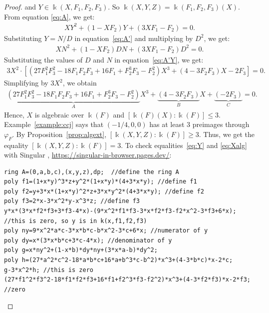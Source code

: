 \documentclass[11pt,reqno]{amsart}
\theoremstyle{definition}
\newcommand{\mbk}{\mbox{$\Bbbk$}}
\begin{document}
\begin{proof}
and $Y\in \mbk(X,F_1,F_2,F_3)$. So $\mbk(X,Y,Z)=\mbk(F_1,F_2,F_3)(X)$. From equation \eqref{eq:A}, we get:
\begin{eqnarray}\label{eq:A'}
XY^2+(1-XF_2)Y+(3XF_1-F_2)=0.
\end{eqnarray}
Substituting $Y=N/D$ in equation~\eqref{eq:A'} and multiplying by $D^2$, we get:
\begin{eqnarray}\label{eq:A'Y}
XN^2+(1-XF_2)DN+(3XF_1-F_2)D^2=0. 
\end{eqnarray}
Substituting the values of $D$ and $N$ in equation~\ref{eq:A'Y}, we get: 
\begin{eqnarray*}
3X^2\cdot\left[(27F_1^2F_3^2-18F_1F_2F_3+16F_1+F_2^3F_3-F_2^2)X^3+(4-3F_2F_3)X-2F_3\right]=0.
\end{eqnarray*}
Simplifying by $3X^2$, we obtain
\begin{eqnarray}\label{eq:Xalg}
\underbrace{(27F_1^2F_3^2-18F_1F_2F_3+16F_1+F_2^3F_3-F_2^2)}_AX^3+
\underbrace{(4-3F_2F_3)}_BX+\underbrace{(-2F_3)}_{C}=0.
\end{eqnarray}
Hence, $X$ is algebraic over $\mbk(F)$ and  
$[\mbk(F)(X):\mbk(F)]\leq 3$.
Example~\ref{example:ccj} says that $(-1/4,0,0)$ has at least
3 preimages through $\varphi_F$. 
By Proposition~\ref{prop:algext}, $[\mbk(X,Y,Z):\mbk(F)]\geq 3$.
Thus, we get the equality $[\mbk(X,Y,Z):\mbk(F)]=3$.
To check equalities~\eqref{eq:Y} and \eqref{eq:Xalg} with {\sc Singular} \cite{dgps},
\url{https://singular-in-browser.pages.dev/}:

\begin{verbatim}
ring A=(0,a,b,c),(x,y,z),dp;  //define the ring A
poly f1=(1+x*y)^3*z+y^2*(1+x*y)*(4+3*x*y); //define f1 
poly f2=y+3*x*(1+x*y)^2*z+3*x*y^2*(4+3*x*y); //define f2
poly f3=2*x-3*x^2*y-x^3*z; //define f3
y*x*(3*x*f2*f3+3*f3-4*x)-(9*x^2*f1*f3-3*x*f2*f3-f2*x^2-3*f3+6*x); 
//this is zero, so y is in k(x,f1,f2,f3)
poly ny=9*x^2*a*c-3*x*b*c-b*x^2-3*c+6*x; //numerator of y
poly dy=x*(3*x*b*c+3*c-4*x); //denominator of y
poly g=x*ny^2+(1-x*b)*dy*ny+(3*x*a-b)*dy^2; 
poly h=(27*a^2*c^2-18*a*b*c+16*a+b^3*c-b^2)*x^3+(4-3*b*c)*x-2*c; 
g-3*x^2*h; //this is zero
(27*f1^2*f3^2-18*f1*f2*f3+16*f1+f2^3*f3-f2^2)*x^3+(4-3*f2*f3)*x-2*f3; //zero
\end{verbatim}
\end{proof}
\end{document}

